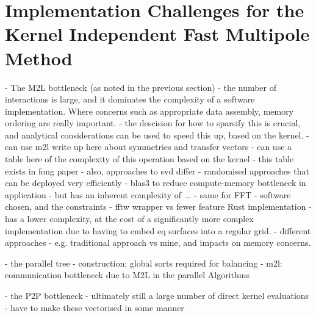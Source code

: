\section{Implementation Challenges for the Kernel Independent Fast Multipole Method }\label{chpt:2:sec:2}

- The M2L bottleneck (as noted in the previous section)
    - the number of interactions is large, and it dominates the complexity of a software implementation. Where concerns such as appropriate data assembly, memory ordering are really important.
    - the descision for how to sparsify this is crucial, and analytical considerations can be used to speed this up, based on the kernel.
        - can use m2l write up here about symmetries and transfer vectors
        - can use a table here of the complexity of this operation based on the kernel
            - this table exists in fong paper
    - also, approaches to svd differ
        - randomised approaches that can be deployed very efficiently
        - blas3 to reduce compute-memory bottleneck in application
        - but has an inherent complexity of ...
    - same for FFT
        - software chosen, and the constraints
            - fftw wrapper vs fewer feature Rust implementation
        - has a lower complexity, at the cost of a significantly more complex implementation due to having to embed eq surfaces into a regular grid.
        - different approaches
            - e.g. traditional approach vs mine, and impacts on memory concerns.

- the parallel tree
    - construction: global sorts required for balancing
    - m2l: communication bottleneck due to M2L in the parallel Algorithms


- the P2P bottleneck
    - ultimately still a large number of direct kernel evaluations
    - have to make these vectorised in some manner
